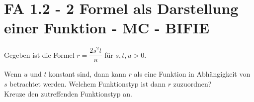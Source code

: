 \section{FA 1.2 - 2 Formel als Darstellung einer Funktion - MC - BIFIE}

\begin{beispiel}[FA 1.2]{1} %
Gegeben ist die Formel $r=\dfrac{2s^2t}{u}$ für $s,t,u>0$.

\leer

Wenn $u$ und $t$ konstant sind, dann kann $r$ als eine Funktion in Abhängigkeit von $s$ betrachtet werden. Welchem Funktionstyp ist dann $r$ zuzuordnen? \\
Kreuze den zutreffenden Funktionstyp an. 


\end{beispiel}